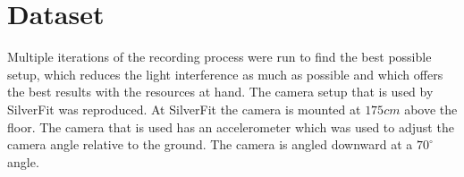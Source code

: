 \section{Dataset}

Multiple iterations of the recording process were run to find the best possible setup, which reduces the light interference as much as possible and which offers the best results with the resources at hand. The camera setup that is used by SilverFit was reproduced. At SilverFit the camera is mounted at $175cm$ above the floor. The camera that is used has an accelerometer which was used to adjust the camera angle relative to the ground. The camera is angled downward at a $70^\circ$ angle. 









